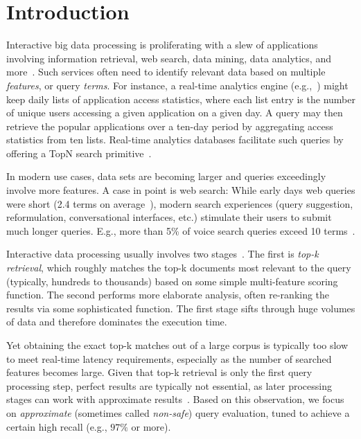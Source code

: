 \section{Introduction}
\label{sec:intro}

Interactive big data processing is proliferating with a slew of applications involving
information retrieval, web search, data mining, data analytics, and more~\cite{top-k-survey}. 
Such services often need to identify relevant data based on multiple \emph{features}, or query \emph{terms}.  
For instance, a real-time analytics engine (e.g.,~\cite{flurry}) might keep daily lists of application access statistics, where each list entry
is the number of unique users accessing a given application on a given day.  
A query may then retrieve the popular applications over a  ten-day period by aggregating  access statistics from ten lists.
Real-time analytics databases facilitate such queries by offering a  TopN search primitive~\cite{druid-topN}.

In modern use cases,  data sets are becoming larger and queries exceedingly  involve more features. 
A case in point is web search:  
While  early days web queries were short (2.4 terms on average~\cite{Spink:2001:SWP:362968.362979}), 
modern search experiences (query suggestion, reformulation, conversational interfaces, etc.) stimulate their users to submit much longer queries. 
E.g., more than 5\% of voice search queries exceed 10 terms~\cite{sigir/Guy16}. 

Interactive data processing   usually involves two stages~\cite{Wang:2011}. 
The first  is \emph{top-k retrieval}, which roughly matches the top-k documents most relevant to the query 
(typically, hundreds to thousands) based on some simple multi-feature  scoring function. 
The second  performs more elaborate analysis, 
often re-ranking the  results via some sophisticated function. 
The first stage  sifts through huge volumes of data and therefore dominates the execution time. 

Yet obtaining the exact top-k matches out of a large corpus is typically too slow to meet real-time latency requirements, 
especially as the number of searched features becomes large.
Given that  top-k retrieval is only the first query  processing step, perfect results are typically not essential, as later  processing 
stages can work with approximate results~\cite{Crane:2017,Lin:2015,Wang:2011,druid-topN}. 
Based on this observation, we focus on \emph{approximate} 
(sometimes called \emph{non-safe}) query evaluation, tuned to achieve a certain high recall (e.g., $97\%$ or more). 

